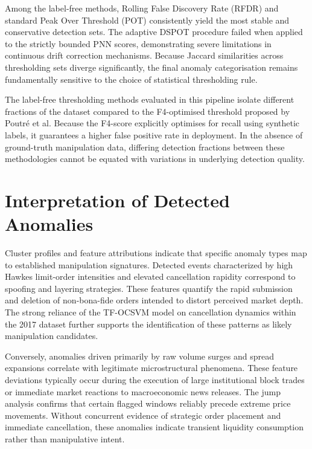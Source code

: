\documentclass[11pt]{report}
\begin{document}
Among the label-free methods, Rolling False Discovery Rate (RFDR) and standard Peak Over Threshold (POT) consistently yield the most stable and conservative detection sets. The adaptive DSPOT procedure failed when applied to the strictly bounded PNN scores, demonstrating severe limitations in continuous drift correction mechanisms. Because Jaccard similarities across thresholding sets diverge significantly, the final anomaly categorisation remains fundamentally sensitive to the choice of statistical thresholding rule.

The label-free thresholding methods evaluated in this pipeline isolate different fractions of the dataset compared to the F4-optimised threshold proposed by Poutré et al. Because the F4-score explicitly optimises for recall using synthetic labels, it guarantees a higher false positive rate in deployment. In the absence of ground-truth manipulation data, differing detection fractions between these methodologies cannot be equated with variations in underlying detection quality.


\section{Interpretation of Detected Anomalies}\label{sec:discussion:interpretation}

Cluster profiles and feature attributions indicate that specific anomaly types map to established manipulation signatures. Detected events characterized by high Hawkes limit-order intensities and elevated cancellation rapidity correspond to spoofing and layering strategies. These features quantify the rapid submission and deletion of non-bona-fide orders intended to distort perceived market depth. The strong reliance of the TF-OCSVM model on cancellation dynamics within the 2017 dataset further supports the identification of these patterns as likely manipulation candidates.

Conversely, anomalies driven primarily by raw volume surges and spread expansions correlate with legitimate microstructural phenomena. These feature deviations typically occur during the execution of large institutional block trades or immediate market reactions to macroeconomic news releases. The jump analysis confirms that certain flagged windows reliably precede extreme price movements. Without concurrent evidence of strategic order placement and immediate cancellation, these anomalies indicate transient liquidity consumption rather than manipulative intent.
\end{document}

